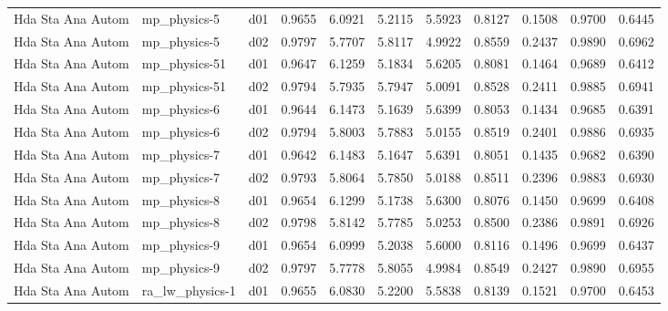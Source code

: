 \begin{longtable}{lllrrrrrrrr}
    Hda Sta Ana Autom  &          mp\_physics-5 &     d01 &   0.9655 &   6.0921 &   5.2115 &       5.5923 &        0.8127 &       0.1508 &           0.9700 &  0.6445 \\
    Hda Sta Ana Autom  &          mp\_physics-5 &     d02 &   0.9797 &   5.7707 &   5.8117 &       4.9922 &        0.8559 &       0.2437 &           0.9890 &  0.6962 \\
    Hda Sta Ana Autom  &         mp\_physics-51 &     d01 &   0.9647 &   6.1259 &   5.1834 &       5.6205 &        0.8081 &       0.1464 &           0.9689 &  0.6412 \\
    Hda Sta Ana Autom  &         mp\_physics-51 &     d02 &   0.9794 &   5.7935 &   5.7947 &       5.0091 &        0.8528 &       0.2411 &           0.9885 &  0.6941 \\
    Hda Sta Ana Autom  &          mp\_physics-6 &     d01 &   0.9644 &   6.1473 &   5.1639 &       5.6399 &        0.8053 &       0.1434 &           0.9685 &  0.6391 \\
    Hda Sta Ana Autom  &          mp\_physics-6 &     d02 &   0.9794 &   5.8003 &   5.7883 &       5.0155 &        0.8519 &       0.2401 &           0.9886 &  0.6935 \\
    Hda Sta Ana Autom  &          mp\_physics-7 &     d01 &   0.9642 &   6.1483 &   5.1647 &       5.6391 &        0.8051 &       0.1435 &           0.9682 &  0.6390 \\
    Hda Sta Ana Autom  &          mp\_physics-7 &     d02 &   0.9793 &   5.8064 &   5.7850 &       5.0188 &        0.8511 &       0.2396 &           0.9883 &  0.6930 \\
    Hda Sta Ana Autom  &          mp\_physics-8 &     d01 &   0.9654 &   6.1299 &   5.1738 &       5.6300 &        0.8076 &       0.1450 &           0.9699 &  0.6408 \\
    Hda Sta Ana Autom  &          mp\_physics-8 &     d02 &   0.9798 &   5.8142 &   5.7785 &       5.0253 &        0.8500 &       0.2386 &           0.9891 &  0.6926 \\
    Hda Sta Ana Autom  &          mp\_physics-9 &     d01 &   0.9654 &   6.0999 &   5.2038 &       5.6000 &        0.8116 &       0.1496 &           0.9699 &  0.6437 \\
    Hda Sta Ana Autom  &          mp\_physics-9 &     d02 &   0.9797 &   5.7778 &   5.8055 &       4.9984 &        0.8549 &       0.2427 &           0.9890 &  0.6955 \\
    Hda Sta Ana Autom  &       ra\_lw\_physics-1 &     d01 &   0.9655 &   6.0830 &   5.2200 &       5.5838 &        0.8139 &       0.1521 &           0.9700 &  0.6453 \\

\end{longtable}
